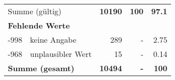 \begin{longtable}{lXrrr}
     \midrule
     \multicolumn{2}{l}{Summe (gültig)} &
       \textbf{\num{10190}} &
     \textbf{\num{100}} &
       \textbf{\num[round-mode=places,round-precision=2]{97.1}} \\
     \multicolumn{5}{l}{\textbf{Fehlende Werte}}\\
       -998 &
       keine Angabe &
         \num{289} &
        - &
         \num[round-mode=places,round-precision=2]{2.75} \\
       -968 &
       unplausibler Wert &
         \num{15} &
        - &
         \num[round-mode=places,round-precision=2]{0.14} \\
     \midrule
     \multicolumn{2}{l}{\textbf{Summe (gesamt)}} &
          \textbf{\num{10494}} &
        \textbf{-} &
        \textbf{\num{100}} \\
     \bottomrule
     \end{longtable}
     
